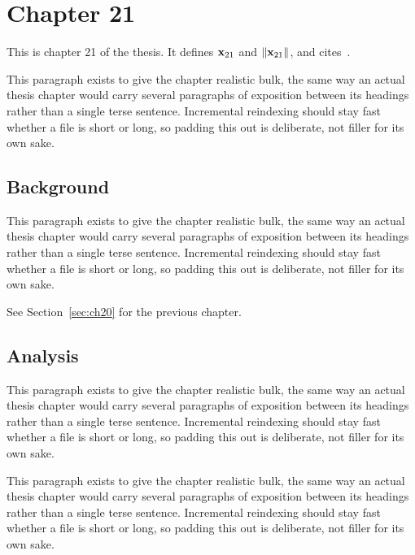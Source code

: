 \section{Chapter 21}
\label{sec:ch21}

This is chapter 21 of the thesis. It defines $\mathbf{x}_{21}$ and $\lVert \mathbf{x}_{21} \rVert$, and cites~\cite{ref1}.

This paragraph exists to give the chapter realistic bulk, the same way an actual thesis chapter would carry several paragraphs of exposition between its headings rather than a single terse sentence. Incremental reindexing should stay fast whether a file is short or long, so padding this out is deliberate, not filler for its own sake.

\subsection{Background}
\label{sec:ch21:background}

This paragraph exists to give the chapter realistic bulk, the same way an actual thesis chapter would carry several paragraphs of exposition between its headings rather than a single terse sentence. Incremental reindexing should stay fast whether a file is short or long, so padding this out is deliberate, not filler for its own sake.

See Section~\ref{sec:ch20} for the previous chapter.

\subsection{Analysis}
\label{sec:ch21:analysis}

This paragraph exists to give the chapter realistic bulk, the same way an actual thesis chapter would carry several paragraphs of exposition between its headings rather than a single terse sentence. Incremental reindexing should stay fast whether a file is short or long, so padding this out is deliberate, not filler for its own sake.

This paragraph exists to give the chapter realistic bulk, the same way an actual thesis chapter would carry several paragraphs of exposition between its headings rather than a single terse sentence. Incremental reindexing should stay fast whether a file is short or long, so padding this out is deliberate, not filler for its own sake.
